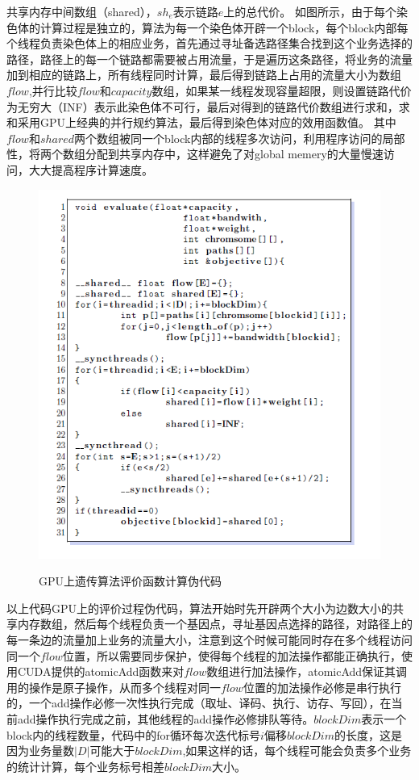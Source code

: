 共享内存中间数组（shared），$sh_e$表示链路$e$上的总代价。\newline
  如图所示，由于每个染色体的计算过程是独立的，算法为每一个染色体开辟一个block，每个block内部每个线程负责染色体上的相应业务，首先通过寻址备选路径集合找到这个业务选择的路径，路径上的每一个链路都需要被占用流量，于是遍历这条路径，将业务的流量加到相应的链路上，所有线程同时计算，最后得到链路上占用的流量大小为数组$flow$,并行比较$flow$和$capacity$数组，如果某一线程发现容量超限，则设置链路代价为无穷大（INF）表示此染色体不可行，最后对得到的链路代价数组进行求和，求和采用GPU上经典的并行规约算法，最后得到染色体对应的效用函数值。
  其中$flow$和$shared$两个数组被同一个block内部的线程多次访问，利用程序访问的局部性，将两个数组分配到共享内存中，这样避免了对global memery的大量慢速访问，大大提高程序计算速度。
\begin{figure}
  \begin{center}
    {\includegraphics[width=1 \textwidth]{figures/GPUfitcode.png}}
    \end{center}
  \caption{{\footnotesize{GPU上遗传算法评价函数计算伪代码}}}
  \label{IterNum}
\end{figure}
  以上代码GPU上的评价过程伪代码，算法开始时先开辟两个大小为边数大小的共享内存数组，然后每个线程负责一个基因点，寻址基因点选择的路径，对路径上的每一条边的流量加上业务的流量大小，注意到这个时候可能同时存在多个线程访问同一个$flow$位置，所以需要同步保护，使得每个线程的加法操作都能正确执行，使用CUDA提供的atomicAdd函数来对$flow$数组进行加法操作，atomicAdd保证其调用的操作是原子操作，从而多个线程对同一$flow$位置的加法操作必修是串行执行的，一个add操作必修一次性执行完成（取址、译码、执行、访存、写回），在当前add操作执行完成之前，其他线程的add操作必修排队等待。$blockDim$表示一个block内的线程数量，代码中的for循环每次迭代标号$i$偏移$blockDim$的长度，这是因为业务量数$|D|$可能大于$blockDim$,如果这样的话，每个线程可能会负责多个业务的统计计算，每个业务标号相差$blockDim$大小。
